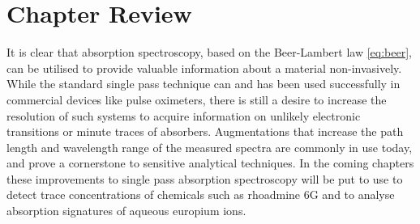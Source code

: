 


\section*{Chapter Review}

It is clear that absorption spectroscopy, based on the Beer-Lambert law
\eqref{eq:beer}, can be utilised to provide valuable information about a
material non-invasively. While the standard single pass technique can and has
been used successfully in commercial devices like pulse oximeters, there is
still a desire to increase the resolution of such systems to acquire
information on unlikely electronic transitions or minute traces of absorbers.
Augmentations that increase the path length and wavelength range of the
measured spectra are commonly in use today, and prove a cornerstone to
sensitive analytical techniques. In the coming chapters these improvements to
single pass absorption spectroscopy will be put to use to detect trace
concentrations of chemicals such as rhoadmine 6G and to analyse absorption
signatures of aqueous europium ions.
